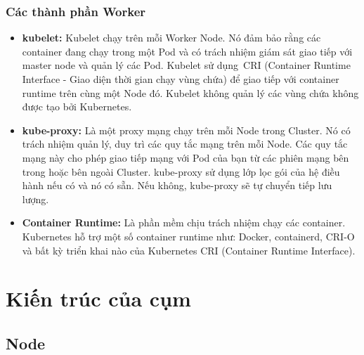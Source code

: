 \documentclass[12pt,a4paper]{report}
\begin{document}
	\subsubsection{Các thành phần Worker}
	
	\hspace{1cm}{Có nhiệm vụ xử lý khối lượng công việc của application trong cluster, duy trì các nhóm đang chạy và cung cấp môi trường runtime cho Kubernetes. Worker sẽ bao gồm 3 thành phần chính sau:}
	\begin{itemize}
		\item \textbf{kubelet:}
		\smallskip
		\subitem
		Kubelet chạy trên mỗi Worker Node. Nó đảm bảo rằng các container đang chạy trong một Pod và có trách nhiệm giám sát giao tiếp với master node và quản lý các Pod. Kubelet sử dụng CRI (Container Runtime Interface - Giao diện thời gian chạy vùng chứa) để giao tiếp với container runtime trên cùng một Node đó. Kubelet không quản lý các vùng chứa không được tạo bởi Kubernetes.
		
		\item \textbf{kube-proxy:}
		\smallskip
		\subitem
		Là một proxy mạng chạy trên mỗi Node trong Cluster. Nó có trách nhiệm quản lý, duy trì các quy tắc mạng trên mỗi Node. Các quy tắc mạng này cho phép giao tiếp mạng với Pod của bạn từ các phiên mạng bên trong hoặc bên ngoài Cluster. kube-proxy sử dụng lớp lọc gói của hệ điều hành nếu có và nó có sẵn. Nếu không, kube-proxy sẽ tự chuyển tiếp lưu lượng.
		
		\item \textbf{Container Runtime:}
		\smallskip
		\subitem
		Là phần mềm chịu trách nhiệm chạy các container. Kubernetes hỗ trợ một số container runtime như: Docker, containerd, CRI-O và bất kỳ triển khai nào của Kubernetes CRI (Container Runtime Interface).
	\end{itemize}
	
	\section{Kiến trúc của cụm}
	
	\subsection{Node}
	
		\hspace{1cm}{Kubernetes chạy khối lượng công việc bằng cách đặt các container vào các Pod để chạy trên các Node. Một Node có thể là một máy ảo hoặc vật lý, tùy thuộc vào cụm. Mỗi Node được quản lý bởi control plane và chứa các dịch vụ cần thiết để chạy các Pod.\\}
	
\end{document}
